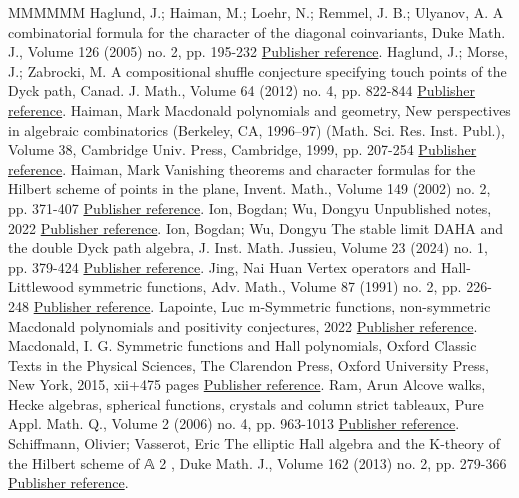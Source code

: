 \begin{thebibliography}{MMMMMM}
 Haglund, J.; Haiman, M.; Loehr, N.; Remmel, J. B.; Ulyanov, A. A combinatorial formula for the character of the diagonal coinvariants, Duke Math. J., Volume 126 (2005) no. 2, pp. 195-232 \href{https://alco.centre-mersenne.org/articles/10.5802/alco.395/#HHLRU-2003}{Publisher reference}.
 Haglund, J.; Morse, J.; Zabrocki, M. A compositional shuffle conjecture specifying touch points of the Dyck path, Canad. J. Math., Volume 64 (2012) no. 4, pp. 822-844 \href{https://alco.centre-mersenne.org/articles/10.5802/alco.395/#HMZ}{Publisher reference}.
 Haiman, Mark Macdonald polynomials and geometry, New perspectives in algebraic combinatorics (Berkeley, CA, 1996–97) (Math. Sci. Res. Inst. Publ.), Volume 38, Cambridge Univ. Press, Cambridge, 1999, pp. 207-254 \href{https://alco.centre-mersenne.org/articles/10.5802/alco.395/#HMacDG}{Publisher reference}.
 Haiman, Mark Vanishing theorems and character formulas for the Hilbert scheme of points in the plane, Invent. Math., Volume 149 (2002) no. 2, pp. 371-407 \href{https://alco.centre-mersenne.org/articles/10.5802/alco.395/#HVanish}{Publisher reference}.
 Ion, Bogdan; Wu, Dongyu Unpublished notes, 2022 \href{https://alco.centre-mersenne.org/articles/10.5802/alco.395/#IW_2022}{Publisher reference}.
 Ion, Bogdan; Wu, Dongyu The stable limit DAHA and the double Dyck path algebra, J. Inst. Math. Jussieu, Volume 23 (2024) no. 1, pp. 379-424 \href{https://alco.centre-mersenne.org/articles/10.5802/alco.395/#Ion_2022}{Publisher reference}.
 Jing, Nai Huan Vertex operators and Hall-Littlewood symmetric functions, Adv. Math., Volume 87 (1991) no. 2, pp. 226-248 \href{https://alco.centre-mersenne.org/articles/10.5802/alco.395/#Jing_91}{Publisher reference}.
 Lapointe, Luc m-Symmetric functions, non-symmetric Macdonald polynomials and positivity conjectures, 2022 \href{https://alco.centre-mersenne.org/articles/10.5802/alco.395/#lapointe2022msymmetric}{Publisher reference}.
 Macdonald, I. G. Symmetric functions and Hall polynomials, Oxford Classic Texts in the Physical Sciences, The Clarendon Press, Oxford University Press, New York, 2015, xii+475 pages \href{https://alco.centre-mersenne.org/articles/10.5802/alco.395/#Macdonald}{Publisher reference}.
 Ram, Arun Alcove walks, Hecke algebras, spherical functions, crystals and column strict tableaux, Pure Appl. Math. Q., Volume 2 (2006) no. 4, pp. 963-1013 \href{https://alco.centre-mersenne.org/articles/10.5802/alco.395/#ram2006alcove}{Publisher reference}.
 Schiffmann, Olivier; Vasserot, Eric The elliptic Hall algebra and the K-theory of the Hilbert scheme of 𝔸 2 , Duke Math. J., Volume 162 (2013) no. 2, pp. 279-366 \href{https://alco.centre-mersenne.org/articles/10.5802/alco.395/#SV}{Publisher reference}.
\end{thebibliography}
